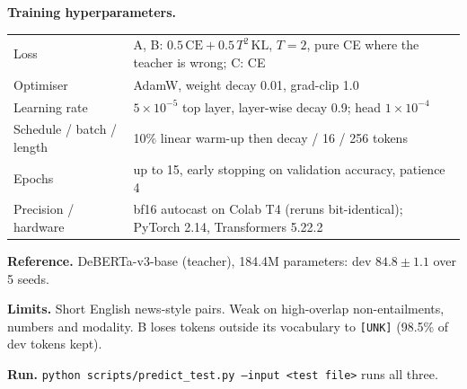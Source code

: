 \documentclass[11pt]{article}
\begin{document}
\textbf{Training hyperparameters.}\\[2pt]
\begin{tabularx}{\linewidth}{@{}lX@{}}
\toprule
Loss & A, B: $0.5\,\mathrm{CE} + 0.5\,T^2\,\mathrm{KL}$, $T{=}2$, pure CE where the teacher is wrong; C: CE \\
Optimiser & AdamW, weight decay 0.01, grad-clip 1.0 \\
Learning rate & $5\times10^{-5}$ top layer, layer-wise decay 0.9; head $1\times10^{-4}$ \\
Schedule / batch / length & 10\% linear warm-up then decay / 16 / 256 tokens \\
Epochs & up to 15, early stopping on validation accuracy, patience 4 \\
Precision / hardware & bf16 autocast on Colab T4 (reruns bit-identical); PyTorch 2.14, Transformers 5.22.2 \\
\bottomrule
\end{tabularx}

\textbf{Reference.} DeBERTa-v3-base (teacher), 184.4M parameters: dev $84.8 \pm 1.1$ over 5 seeds.

\textbf{Limits.} Short English news-style pairs. Weak on high-overlap non-entailments, numbers and modality. B loses tokens outside its vocabulary to \texttt{[UNK]} (98.5\% of dev tokens kept).

\textbf{Run.} \texttt{python scripts/predict\_test.py --input <test file>} runs all three.
\end{document}
